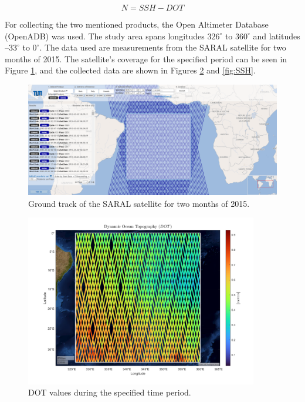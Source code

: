 \documentclass[12pt]{article}
\begin{document}
	\begin{equation}
		N = SSH - DOT
		\label{eq:relation}
	\end{equation}
	
	For collecting the two mentioned products, the Open Altimeter Database (OpenADB) was used. The study area spans longitudes $326^\circ$ to $360^\circ$ and latitudes $–33^\circ$ to $0^\circ$. The data used are measurements from the SARAL satellite for two months of 2015. The satellite’s coverage for the specified period can be seen in Figure \ref{fig:GT}, and the collected data are shown in Figures \ref{fig:DOT} and \ref{fig:SSH}.
	
	\begin{figure}[h!]
		\centering
		\includegraphics[width=13cm]{../Plots/Screenshot 2024-06-29 183022.png}
		\caption{Ground track of the SARAL satellite for two months of 2015.}
		\label{fig:GT}
	\end{figure}
	
	\begin{figure}[h!]
		\centering
		\includegraphics[height=7.5cm]{../Plots/DOT.pdf}
		\caption{DOT values during the specified time period.}
		\label{fig:DOT}
	\end{figure}
	
\end{document}
